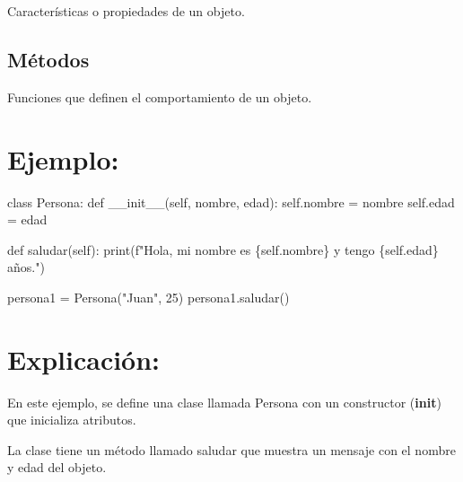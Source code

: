 \documentclass[
  a4paper,
  DIV=11,
  numbers=noendperiod,
  onepage,
  openany]{scrreprt}
\newenvironment{Shaded}{\begin{snugshade}}{\end{snugshade}}
\newcommand{\BuiltInTok}[1]{\textcolor[rgb]{0.00,0.23,0.31}{#1}}
\newcommand{\DecValTok}[1]{\textcolor[rgb]{0.68,0.00,0.00}{#1}}
\newcommand{\FunctionTok}[1]{\textcolor[rgb]{0.28,0.35,0.67}{#1}}
\newcommand{\KeywordTok}[1]{\textcolor[rgb]{0.00,0.23,0.31}{#1}}
\newcommand{\NormalTok}[1]{\textcolor[rgb]{0.00,0.23,0.31}{#1}}
\newcommand{\OperatorTok}[1]{\textcolor[rgb]{0.37,0.37,0.37}{#1}}
\newcommand{\SpecialCharTok}[1]{\textcolor[rgb]{0.37,0.37,0.37}{#1}}
\newcommand{\SpecialStringTok}[1]{\textcolor[rgb]{0.13,0.47,0.30}{#1}}
\newcommand{\StringTok}[1]{\textcolor[rgb]{0.13,0.47,0.30}{#1}}
\newcommand{\VariableTok}[1]{\textcolor[rgb]{0.07,0.07,0.07}{#1}}
\begin{document}
Características o propiedades de un objeto.

\hypertarget{muxe9todos-1}{%
\subsection{Métodos}\label{muxe9todos-1}}

Funciones que definen el comportamiento de un objeto.

\hypertarget{ejemplo-49}{%
\section{Ejemplo:}\label{ejemplo-49}}

\begin{Shaded}
\begin{Highlighting}[]
\KeywordTok{class}\NormalTok{ Persona:}
    \KeywordTok{def} \FunctionTok{\_\_init\_\_}\NormalTok{(}\VariableTok{self}\NormalTok{, nombre, edad):}
        \VariableTok{self}\NormalTok{.nombre }\OperatorTok{=}\NormalTok{ nombre}
        \VariableTok{self}\NormalTok{.edad }\OperatorTok{=}\NormalTok{ edad}

    \KeywordTok{def}\NormalTok{ saludar(}\VariableTok{self}\NormalTok{):}
        \BuiltInTok{print}\NormalTok{(}\SpecialStringTok{f"Hola, mi nombre es }\SpecialCharTok{\{}\VariableTok{self}\SpecialCharTok{.}\NormalTok{nombre}\SpecialCharTok{\}}\SpecialStringTok{ y tengo }\SpecialCharTok{\{}\VariableTok{self}\SpecialCharTok{.}\NormalTok{edad}\SpecialCharTok{\}}\SpecialStringTok{ años."}\NormalTok{)}

\NormalTok{persona1 }\OperatorTok{=}\NormalTok{ Persona(}\StringTok{"Juan"}\NormalTok{, }\DecValTok{25}\NormalTok{)}
\NormalTok{persona1.saludar()}
\end{Highlighting}
\end{Shaded}

\hypertarget{explicaciuxf3n-49}{%
\section{Explicación:}\label{explicaciuxf3n-49}}

En este ejemplo, se define una clase llamada Persona con un constructor
(\textbf{init}) que inicializa atributos.

La clase tiene un método llamado saludar que muestra un mensaje con el
nombre y edad del objeto.
\end{document}
